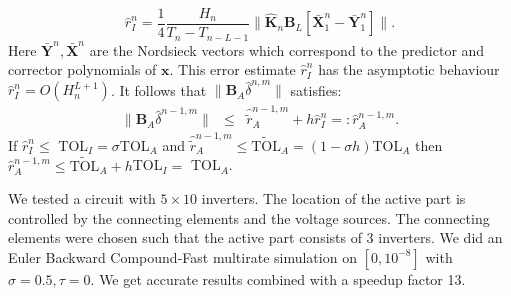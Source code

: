 \documentclass{report}
\begin{document}
\begin{equation}
\hat{r}_I^{n} = \frac{1}{4}\frac{H_n}{T_n - T_{n-L-1}}
\|\hat{\mathbf{K}}_{n}\mathbf{B}_L\left[\bar{\mathbf{X}}_{1}^n-\bar{\mathbf{Y}}_{1}^n\right]
\|.
\end{equation}
Here $\bar{\mathbf{Y}}^n,\bar{\mathbf{X}}^n$ are the Nordsieck vectors
which correspond to the predictor and corrector polynomials of $\mathbf{x}$.
This error estimate $\hat{r}_I^n$ has the asymptotic behaviour
$\hat{r}_I^{n} = O(H_n^{L+1})$.
It follows that
$\|\mathbf{B}_A\hat{\delta}^{n,m}\|$ satisfies:
\begin{equation}\begin{array}{rcl}
\|\mathbf{B}_A\hat{\delta}^{n-1,m}\| &\leq& \hat{\tilde{r}}_A^{n-1,m} +
h\hat{r}_I^{n} =: \hat{r}_A^{n-1,m}.
\end{array}\end{equation}
If $\hat{r}_I^{n} \leq $ TOL$_I = \sigma$TOL$_A$ and
$\hat{\tilde{r}}_A^{n-1,m} \leq \tilde{\mbox{TOL}}_A = (1-\sigma h)$TOL$_A$
then $\hat{r}_A^{n-1,m} \leq \tilde{\mbox{TOL}}_A + h$TOL$_I =$ TOL$_A$.

We tested a circuit with $5 \times 10$ inverters.
The location of the active part is controlled by the connecting
elements and the voltage sources. The connecting elements were chosen
such that the active part consists of 3 inverters.
We did an Euler Backward Compound-Fast multirate simulation on
$[0,10^{-8}]$ with $\sigma = 0.5,\tau = 0$.
We get accurate results combined with a speedup factor 13.
\end{document}

